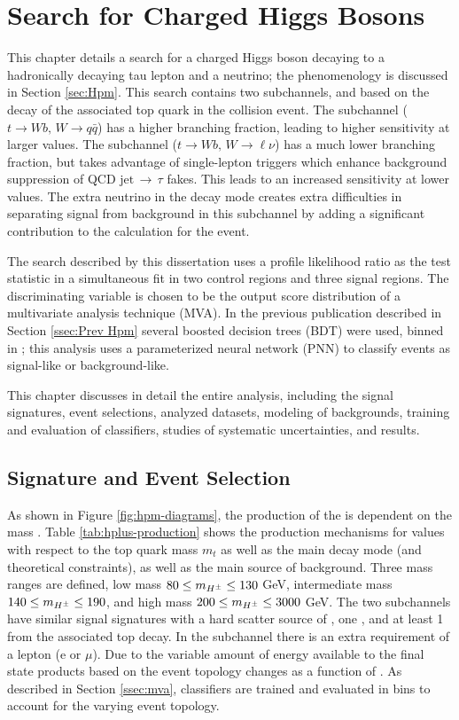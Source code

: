 \chapter{Search for Charged Higgs Bosons}\label{chap:hpana}
	This chapter details a search for a charged Higgs boson decaying to a hadronically decaying tau lepton and a neutrino; the phenomenology is discussed in Section \ref{sec:Hpm}. This search contains two subchannels, \taujets and \taulep based on the decay of the  associated top quark in the collision event. The \taujets subchannel ($t\to Wb, \, W \to q\bar{q}$)  has a higher branching fraction, leading to higher sensitivity at larger \mHpm values. The \taulep subchannel ($t\to Wb, \, W \to \ell \nu$)  has a much lower branching fraction, but takes advantage of single-lepton triggers which enhance background suppression of QCD $\mathrm{jet} \, \to \, \tau$ fakes. This leads to an increased sensitivity at lower \mHpm values. The extra neutrino in the \taulep decay mode creates extra difficulties in separating signal from background in this subchannel by adding a significant contribution to the \Etm calculation for the event. 

	The search described by this dissertation uses a profile likelihood ratio as the test statistic in a simultaneous fit in two control regions and three signal regions. The discriminating variable is chosen to be the output score distribution of a multivariate analysis technique (MVA). In the previous publication described in Section \ref{ssec:Prev Hpm} several boosted decision trees (BDT) were used, binned in \mHpm; this analysis uses a parameterized neural network (PNN) to classify events as signal-like or background-like.

	This chapter discusses in detail the entire analysis, including the signal signatures, event selections, analyzed datasets, modeling of backgrounds, training and evaluation of classifiers, studies of systematic uncertainties, and results.

	\section{Signature and Event Selection}\label{sec:signal}
		As shown in Figure \ref{fig:hpm-diagrams}, the production of the \Hpm is dependent on the mass \mHpm. Table \ref{tab:hplus-production} shows the production mechanisms for \mHpm values with respect to the top quark mass $m_t$ as well as the main decay mode (and theoretical constraints), as well as the main source of background. Three mass ranges are defined, low mass $80 \leq m_{H^{\pm}} \leq 130 $ GeV, intermediate mass $140 \leq m_{H^{\pm}} \leq 190$, and high mass $200 \leq m_{H^{\pm}} \leq 3000$ GeV.  The two subchannels have similar signal signatures with a hard scatter source of \Etm, one \tauhad, and at least 1 \bjet from the associated top decay. In the \taulep subchannel there is an extra requirement of a lepton (e or $\mu$). Due to the variable amount of energy available to the final state products based on \mHpm the event topology changes as a function of \mHpm. As described in Section \ref{ssec:mva}, classifiers are trained and evaluated in \mHpm bins to account for the varying event topology.

